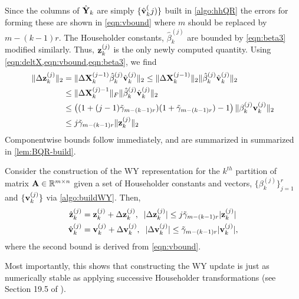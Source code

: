 Since the columns of $\hat{\mathbf{Y}}_k$ are simply $\{\hat{\mathbf{v}}_k^(j)\}$ built in \cref{algo:hhQR} the errors for forming these are shown in \cref{eqn:vbound} where $m$ should be replaced by $m-(k-1)r$.
The Householder constants, $\hat{\beta}_k^{(j)}$ are bounded by \cref{eqn:beta3} modified similarly. 
Thus, $\mathbf{z}_k^{(j)}$ is the only newly computed quantity. 
Using \cref{eqn:deltX,eqn:vbound,eqn:beta3}, we find
\begin{align*}
\|\Delta \mathbf{z}_k^{(j)}\|_2 &= \|\Delta\mathbf{X}_k^{(j-1)}\hat{\beta}_k^{(j)}\hat{\mathbf{v}}_k^{(j)} \|_2 \leq \|\Delta\mathbf{X}_k^{(j-1)}\|_2 \|\hat{\beta}_k^{(j)}\hat{\mathbf{v}}_k^{(j)}\|_2\\
& \leq \|\Delta\mathbf{X}_k^{(j)-1}\|_F\|\hat{\beta}_k^{(j)}\hat{\mathbf{v}}_k^{(j)}\|_2 \\
& \leq \left((1+(j-1)\tilde{\gamma}_{m-(k-1)r})(1 + \tilde{\gamma}_{m-(k-1)r})-1\right) \| \beta_k^{(j)}\mathbf{v}_k^{(j)}\|_2 \\
& \leq j\tilde{\gamma}_{m-(k-1)r}\|\mathbf{z}_k^{(j)}\|_2 
\end{align*}
Componentwise bounds follow immediately, and are summarized in summarized in \cref{lem:BQR-build}.
\begin{lemma}\label{lem:BQR-build}
	Consider the construction of the WY representation for the $k^{th}$ partition of matrix $\mathbf{A}\in\mathbb{R}^{m\times n}$ given a set of Householder constants and vectors, $\{\beta_k^{(j)}\}_{j=1}^r$ and $\{\mathbf{v}_{k}^{(j)}\}$ via \cref{algo:buildWY}.
	Then, 
	\begin{align}
		\hat{\bb{z}}_{k}^{(j)}& = \bb{z}_{k}^{(j)} + \Delta \bb{z}_{k}^{(j)},\;\; |\Delta \bb{z}_{k}^{(j)}| \leq j\tilde{\gamma}_{m-(k-1)r} |\bb{z}_{k}^{(j)}|\label{eqn:BQR-z}\\
		\hat{\bb{v}}_{k}^{(j)}& = \bb{v}_{k}^{(j)} + \Delta \bb{v}_{k}^{(j)},\;\; |\Delta \bb{v}_{k}^{(j)}| \leq \tilde{\gamma}_{m-(k-1)r} |\bb{v}_{k}^{(j)}|\label{eqn:BQR-v},
	\end{align}
	where the second bound is derived from \cref{eqn:vbound}.
\end{lemma}
Most importantly, this shows that constructing the WY update is just as numerically stable as applying successive Householder transformations (see Section 19.5 of \cite{Higham2002}).

